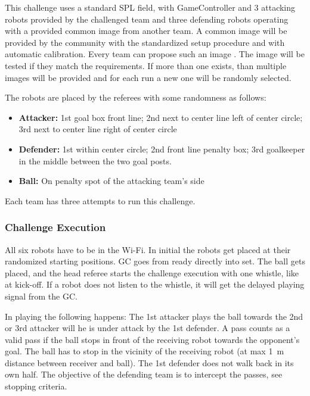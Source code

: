     This challenge uses a standard SPL field, with GameController and 3 attacking robots provided by the challenged team and three defending robots operating with a provided common image from another team. A common image will be provided by the community with the standardized setup procedure and with automatic calibration. Every team can propose such an image . The image will be tested if they match the requirements.  If more than one exists, than multiple images will be provided and for each run a new one will be randomly selected.


    The robots are placed by the referees with some randomness as follows:
    \begin{itemize}
        \item \textbf{Attacker:} 1st goal box front line; 2nd next to center line left of center circle; 3rd next to center line right of center circle
        \item \textbf{Defender:} 1st within center circle; 2nd front line penalty box; 3rd goalkeeper in the middle between the two goal posts.
        \item \textbf{Ball:} On penalty spot of the attacking team's side 
    \end{itemize}

    Each team has three attempts to run this challenge.

    \subsubsection{Challenge Execution}

    All six robots have to be in the Wi-Fi. In initial the robots get placed at their randomized starting positions. GC goes from ready directly into set. The ball gets placed, and the head referee starts the challenge execution with one whistle, like at kick-off. If a robot does not listen to the whistle, it will get the delayed playing signal from the GC.

    In playing the following happens: The 1st attacker plays the ball towards the 2nd or 3rd attacker will he is under attack by the 1st defender. A pass counts as a valid pass if the ball stops in front of the receiving robot towards the opponent's goal. The ball has to stop in the vicinity of the receiving robot (at max \qty{1}{\metre} distance between receiver and ball). 
    The 1st defender does not walk back in its own half. The objective of the defending team is to intercept the passes, see stopping criteria.

